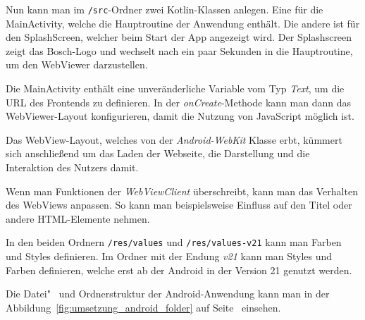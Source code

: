 Nun kann man im \texttt{/src}-Ordner zwei Kotlin-Klassen anlegen. Eine für die MainActivity, welche die Hauptroutine der
Anwendung enthält. Die andere ist für den SplashScreen, welcher beim Start der App angezeigt wird. Der Splashscreen
zeigt das Bosch-Logo und wechselt nach ein paar Sekunden in die Hauptroutine, um den WebViewer darzustellen.

Die MainActivity enthält eine unveränderliche Variable vom Typ \textit{Text}, um die URL des Frontends zu definieren. In
der \textit{onCreate}-Methode kann man dann das WebViewer-Layout konfigurieren, damit die Nutzung von JavaScript möglich
ist.

Das WebView-Layout, welches von der \textit{Android-WebKit} Klasse erbt, kümmert sich anschließend um das Laden der
Webseite, die Darstellung und die Interaktion des Nutzers damit.

Wenn man Funktionen der \textit{WebViewClient} überschreibt, kann man das Verhalten des WebViews anpassen. So kann man
beispielsweise Einfluss auf den Titel oder andere HTML-Elemente nehmen.

In den beiden Ordnern \texttt{/res/values} und \texttt{/res/values-v21} kann man Farben und Styles definieren. Im Ordner
mit der Endung \textit{v21} kann man Styles und Farben definieren, welche erst ab der Android in der Version 21 genutzt
werden.

Die Datei"~ und Ordnerstruktur der Android-Anwendung kann man in der Abbildung~\ref{fig:umsetzung_android_folder} auf
Seite~\pageref{fig:umsetzung_android_folder} einsehen.

